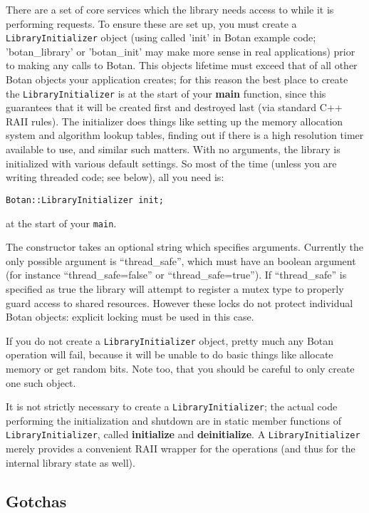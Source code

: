 \documentclass{article}
\newcommand{\function}[1]{\textbf{#1}}
\newcommand{\type}[1]{\texttt{#1}}
\begin{document}
There are a set of core services which the library needs access to
while it is performing requests. To ensure these are set up, you must
create a \type{LibraryInitializer} object (using called 'init' in
Botan example code; 'botan\_library' or 'botan\_init' may make more
sense in real applications) prior to making any calls to Botan. This
objects lifetime must exceed that of all other Botan objects your
application creates; for this reason the best place to create the
\type{LibraryInitializer} is at the start of your \function{main}
function, since this guarantees that it will be created first and
destroyed last (via standard C++ RAII rules). The initializer does
things like setting up the memory allocation system and algorithm
lookup tables, finding out if there is a high resolution timer
available to use, and similar such matters. With no arguments, the
library is initialized with various default settings. So most of the
time (unless you are writing threaded code; see below), all you need
is:

\texttt{Botan::LibraryInitializer init;}

at the start of your \texttt{main}.

The constructor takes an optional string which specifies arguments.
Currently the only possible argument is ``thread\_safe'', which must
have an boolean argument (for instance ``thread\_safe=false'' or
``thread\_safe=true''). If ``thread\_safe'' is specified as true the
library will attempt to register a mutex type to properly guard access
to shared resources. However these locks do not protect individual
Botan objects: explicit locking must be used in this case.

If you do not create a \type{LibraryInitializer} object, pretty much
any Botan operation will fail, because it will be unable to do basic
things like allocate memory or get random bits. Note too, that you
should be careful to only create one such object.

It is not strictly necessary to create a \type{LibraryInitializer};
the actual code performing the initialization and shutdown are in
static member functions of \type{LibraryInitializer}, called
\function{initialize} and \function{deinitialize}. A
\type{LibraryInitializer} merely provides a convenient RAII wrapper
for the operations (and thus for the internal library state as well).

\subsection{Gotchas}
\end{document}
